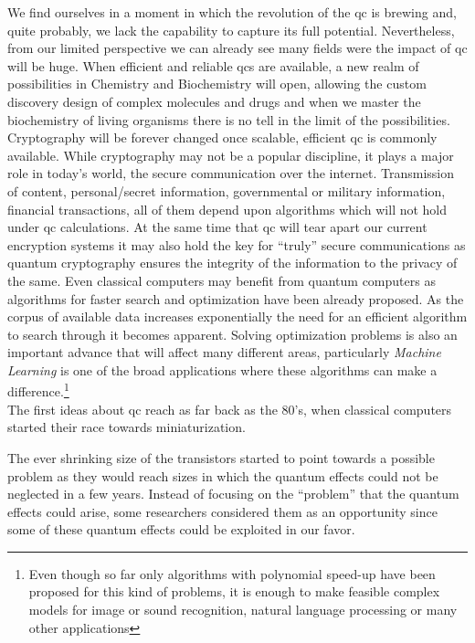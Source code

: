 We find ourselves in a moment in which the revolution of the \acl{qc} is brewing and, quite probably, we lack the capability to capture its full potential. Nevertheless, from our limited perspective we can already see many fields were the impact of \acl{qc} will be huge.
When efficient and reliable \acp{qc} are available, a new realm of possibilities in Chemistry and Biochemistry will open, allowing the custom discovery design of complex molecules and drugs and when we master the biochemistry of living organisms there is no tell in the limit of the possibilities.
Cryptography will be forever changed once scalable, efficient \acl{qc} is commonly available. While cryptography may not be a popular discipline, it plays a major role in today's world, the secure communication over the internet. Transmission of content, personal/secret information, governmental or military information, financial transactions, all of them depend upon algorithms which will not hold under \acl{qc} calculations\cite{Shor1994}.
At the same time that \ac{qc} will tear apart our current encryption systems it may also hold the key for ``truly'' secure communications as quantum cryptography ensures the integrity of the information to the privacy of the same.
Even classical computers may benefit from quantum computers as algorithms for faster search and optimization have been already proposed. As the corpus of available data increases exponentially the need for an efficient algorithm to search through it\cite{Grover1997} becomes apparent. Solving optimization problems\cite{Durr2006,Montanaro2016,Brandao2017} is also an important advance that will affect many different areas, particularly \emph{Machine Learning} is one of the broad applications where these algorithms can make a difference.\footnote{Even though so far only algorithms with polynomial speed-up have been proposed for this kind of problems, it is enough to make feasible complex models for image or sound recognition, natural language processing or many other applications}\\


The first ideas about \acl{qc} reach as far back as the 80's\cite{Benioff1980,Feynman1982}, when classical computers started their race towards miniaturization.

The ever shrinking size of the transistors\cite{Moore1965} started to point towards a possible problem as they would reach sizes in which the quantum effects could not be neglected in a few years.
Instead of focusing on the ``problem'' that the quantum effects could arise, some researchers\cite{Benioff1980,Feynman1982} considered them as an opportunity since some of these quantum effects could be exploited in our favor.

